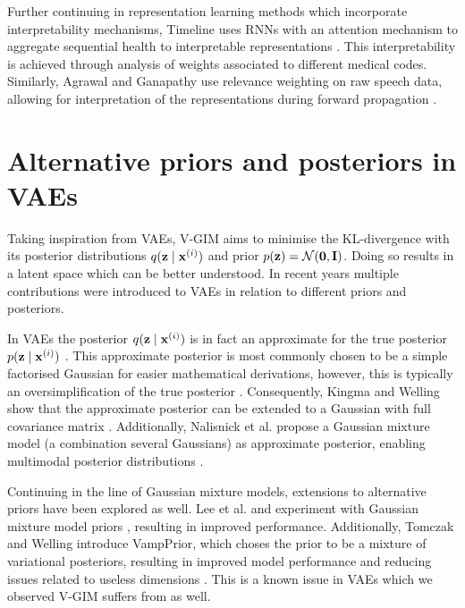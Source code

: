 	Further continuing in representation learning methods which incorporate interpretability mechanisms, Timeline uses RNNs with an attention mechanism to aggregate sequential health to interpretable representations \cite{baiInterpretableRepresentationLearning2018}. This interpretability is achieved through analysis of weights associated to different medical codes. Similarly, Agrawal and Ganapathy use relevance weighting on raw speech data, allowing for interpretation of the representations during forward propagation \cite{agrawalInterpretableRepresentationLearning2020}.
	
	
	
		

\section{Alternative priors and posteriors in VAEs}	%
Taking inspiration from VAEs, V-GIM aims to minimise the KL-divergence with its posterior distributions $q (\mathbf{z} \mid \mathbf{x}^{(i)})$ and prior $p(\mathbf{z})=\mathcal{N}(\bm{\mathbf{0}}, \mathbf{I})$. Doing so results in a latent space which can be better understood. In recent years multiple contributions were introduced to VAEs in relation to different priors and posteriors.

In VAEs the posterior $q (\mathbf{z} \mid \mathbf{x}^{(i)})$ is in fact an approximate for the true posterior $p (\mathbf{z} \mid \mathbf{x}^{(i)})$ \cite{odaiboTutorialDerivingStandard2019}. This approximate posterior is most commonly chosen to be a simple factorised Gaussian for easier mathematical derivations, however, this is typically an oversimplification of the true posterior \cite{nalisnickApproximateInferenceDeep}. Consequently, Kingma and Welling show that the approximate posterior can be extended to a Gaussian with full covariance matrix \cite{kingmaIntroductionVariationalAutoencoders2019}. Additionally, Nalisnick et al. propose a Gaussian mixture model (a combination several Gaussians) as approximate posterior, enabling multimodal posterior distributions \cite{nalisnickApproximateInferenceDeep}.

Continuing in the line of Gaussian mixture models, extensions to alternative priors have been explored as well. Lee et al. and experiment with Gaussian mixture model priors \cite{leeMetaGMVAEMixtureGaussian2021, guoVariationalAutoencoderOptimizing2020}, resulting in improved performance. Additionally, Tomczak and Welling introduce VampPrior, which choses the prior to be a mixture of variational posteriors, resulting in improved model performance and reducing issues related to useless dimensions \cite{tomczakVAEVampPrior2018}. This is a known issue in VAEs which we observed V-GIM suffers from as well.
	


